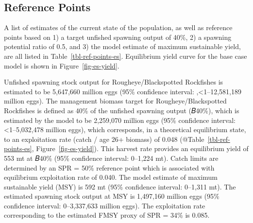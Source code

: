 \documentclass[
]{scrartcl}
\begin{document}
\subsection{Reference Points}\label{reference-points}

A list of estimates of the current state of the population, as well as
reference points based on 1) a target unfished spawning output of 40\%,
2) a spawning potential ratio of 0.5, and 3) the model estimate of
maximum sustainable yield, are all listed in
Table~\ref{tbl-ref-points-es}. Equilibrium yield curve for the base case
model is shown in Figure~\ref{fig-es-yield}.

Unfished spawning stock output for Rougheye/Blackspotted Rockfishes is
estimated to be 5,647,660 million eggs (95\% confidence interval:
,\textless1--12,581,189 million eggs). The management biomass target for
Rougheye/Blackspotted Rockfishes is defined as 40\% of the unfished
spawning output (𝐵40\%), which is estimated by the model to be 2,259,070
million eggs (95\% confidence interval: \textless1--5,032,478 million
eggs), which corresponds, in a theoretical equilibrium state, to an
exploitation rate (catch / age 26+ biomass) of 0.048
(@Table~\ref{tbl-ref-points-es}, Figure~\ref{fig-es-yield}). This
harvest rate provides an equilibrium yield of 553 mt at 𝐵40\% (95\%
confidence interval: 0--1,224 mt). Catch limits are determined by an SPR
= 50\% reference point which is associated with equilibrium exploitation
rate of 0.040. The model estimate of maximum sustainable yield (MSY) is
592 mt (95\% confidence interval: 0--1,311 mt). The estimated spawning
stock output at MSY is 1,497,160 million eggs (95\% confidence interval:
0--3,337,633 million eggs). The exploitation rate corresponding to the
estimated FMSY proxy of SPR = 34\% is 0.085.

\clearpage

\begingroup
\fontsize{9.0pt}{10.8pt}\selectfont
\end{document}
